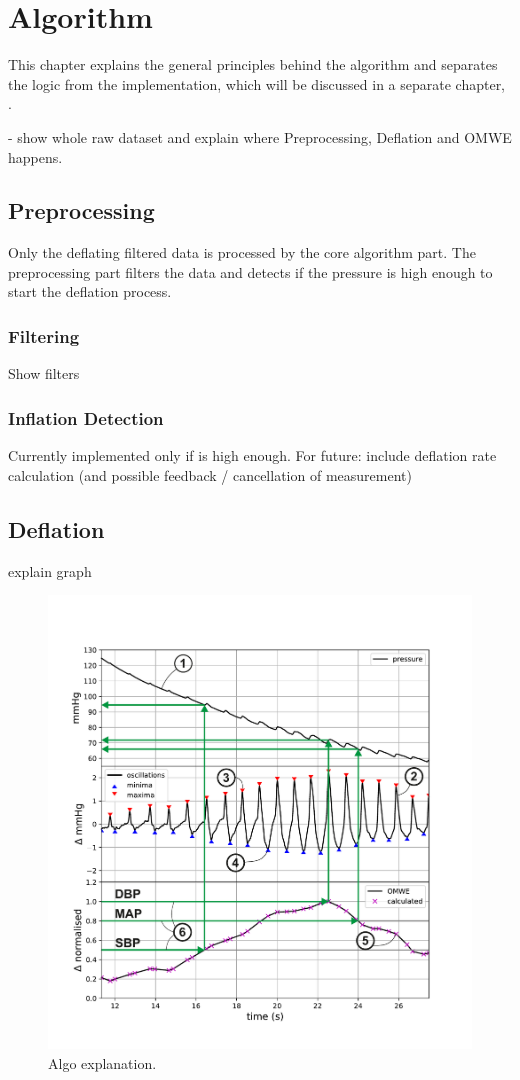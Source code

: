 \chapter{Algorithm}\label{cp:algo}

This chapter explains the general principles behind the algorithm and separates the logic from the implementation, which will be discussed in a separate chapter, . 

- show whole raw dataset and explain where Preprocessing, Deflation and OMWE happens.


\section{Preprocessing}
Only the deflating filtered data is processed by the core algorithm part. The preprocessing part filters the data and detects if the pressure is high enough to start the deflation process. 

\subsection{Filtering}
Show filters
\subsection{Inflation Detection}
Currently implemented only if is high enough. For future: include deflation rate calculation (and possible feedback / cancellation of measurement)
\section{Deflation}
explain graph

\begin{figure}[ht]
\centering
\includegraphics[width=\textwidth]{figures/algorithm_example_annotated.pdf}
\caption{Algo explanation.}
\label{fig:CD}
\end{figure}

